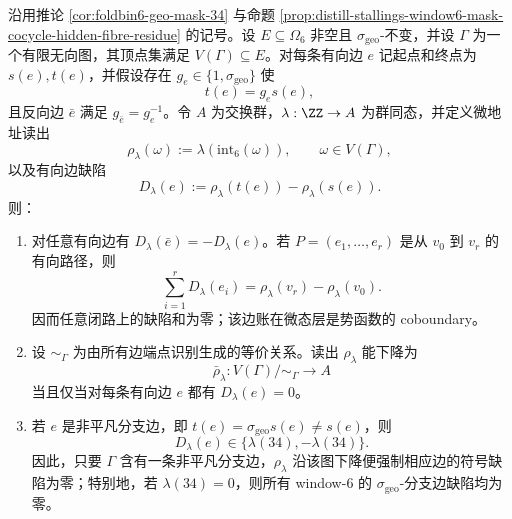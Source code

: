 \begin{proposition}\label{prop:distill-window6-hidden-fibre-edge-ledger-descent}
沿用推论 \ref{cor:foldbin6-geo-mask-34} 与命题 \ref{prop:distill-stallings-window6-mask-cocycle-hidden-fibre-residue} 的记号。设
\(E\subseteq \Omega_6\) 非空且 \(\sigma_{\mathrm{geo}}\)-不变，并设 \(\Gamma\) 为一个有限无向图，其顶点集满足
\(V(\Gamma)\subseteq E\)。对每条有向边 \(e\) 记起点和终点为 \(s(e),t(e)\)，并假设存在
\(g_e\in\{1,\sigma_{\mathrm{geo}}\}\) 使
\[
 t(e)=g_e s(e),
\]
且反向边 \(\bar e\) 满足 \(g_{\bar e}=g_e^{-1}\)。令 \(A\) 为交换群，\(\lambda:\ZZ\to A\) 为群同态，并定义微地址读出
\[
\rho_\lambda(\omega):=\lambda(\mathrm{int}_6(\omega)),
\qquad \omega\in V(\Gamma),
\]
以及有向边缺陷
\[
D_\lambda(e):=\rho_\lambda(t(e))-\rho_\lambda(s(e)).
\]
则：
\begin{enumerate}
  \item 对任意有向边有 \(D_\lambda(\bar e)=-D_\lambda(e)\)。若
  \(P=(e_1,\ldots,e_r)\) 是从 \(v_0\) 到 \(v_r\) 的有向路径，则
  \[
  \sum_{i=1}^r D_\lambda(e_i)=\rho_\lambda(v_r)-\rho_\lambda(v_0).
  \]
  因而任意闭路上的缺陷和为零；该边账在微态层是势函数的 coboundary。
  \item 设 \(\sim_\Gamma\) 为由所有边端点识别生成的等价关系。读出 \(\rho_\lambda\) 能下降为
  \[
  \bar\rho_\lambda:V(\Gamma)/{\sim_\Gamma}\longrightarrow A
  \]
  当且仅当对每条有向边 \(e\) 都有 \(D_\lambda(e)=0\)。
  \item 若 \(e\) 是非平凡分支边，即 \(t(e)=\sigma_{\mathrm{geo}}s(e)\ne s(e)\)，则
  \[
  D_\lambda(e)\in\{\lambda(34),-\lambda(34)\}.
  \]
  因此，只要 \(\Gamma\) 含有一条非平凡分支边，\(\rho_\lambda\) 沿该图下降便强制相应边的符号缺陷为零；特别地，若 \(\lambda(34)=0\)，则所有 window-\(6\) 的 \(\sigma_{\mathrm{geo}}\)-分支边缺陷均为零。
\end{enumerate}
\end{proposition}
